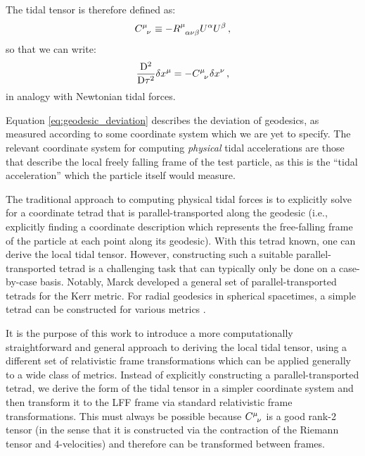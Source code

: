 \documentclass[
    reprint,
    prd,
    nofootinbib,
    amsmath,amssymb,
    aps,
    floatfix,
]{revtex4-2}
\begin{document}
The tidal tensor is therefore defined as:
\begin{equation}
    \tensor{C}{^{\mu}_{\nu}} \equiv -\tensor{R}{^{\mu}_{\alpha \nu \beta}} U^{\alpha} U^{\beta} \, ,
    \label{eq:tidal_tensor}
\end{equation}
so that we can write:
\begin{equation}
    \frac{\mathrm{D}^{2}}{\mathrm{D} \tau^{2}} \delta x^{\mu} = -\tensor{C}{^{\mu}_{\nu}} \delta x^{\nu} \, ,
\end{equation}
in analogy with Newtonian tidal forces. 

Equation \ref{eq:geodesic_deviation} describes the deviation of geodesics, as measured according to some coordinate system which we are yet to specify. The relevant coordinate system for computing \textit{physical} tidal accelerations are those that describe the local freely falling frame of the test particle, as this is the ``tidal acceleration'' which the particle itself would measure. 

The traditional approach to computing physical tidal forces is to explicitly solve for a coordinate tetrad that is parallel-transported along the geodesic (i.e., explicitly finding a coordinate description which represents the free-falling frame of the particle at each point along its geodesic). With this tetrad known, one can derive the local tidal tensor. However, constructing such a suitable parallel-transported tetrad is a challenging task that can typically only be done on a case-by-case basis. Notably, Marck \cite{Marck1983} developed a general set of parallel-transported tetrads for the Kerr metric. For radial geodesics in spherical spacetimes, a simple tetrad can be constructed for various metrics \citep[e.g.,][]{Crispino2016, Sharif2018, Hong2020, Vandeev2021, Vandeev2022, Lima2022, Arora2024}.

It is the purpose of this work to introduce a more computationally straightforward and general approach to deriving the local tidal tensor, using a different set of relativistic frame transformations which can be applied generally to a wide class of metrics. Instead of explicitly constructing a parallel-transported tetrad, we derive the form of the tidal tensor in a simpler coordinate system and then transform it to the LFF frame via standard relativistic frame transformations. This must always be possible because $\tensor{C}{^{\mu}_{\nu}}$ is a good rank-2 tensor (in the sense that it is constructed via the contraction of the Riemann tensor and 4-velocities) and therefore can be transformed between frames.
\end{document}
